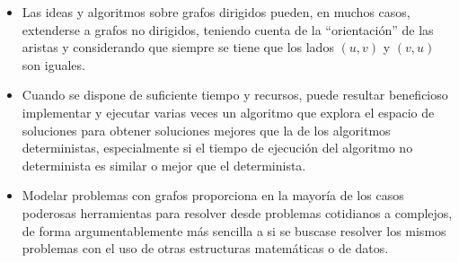 \documentclass[11pt]{article}
\begin{document}
\begin{itemize}
   \item Las ideas y algoritmos sobre grafos dirigidos pueden, en
   muchos casos, extenderse a grafos no dirigidos, teniendo cuenta
   de la ``orientación'' de las aristas y considerando que siempre se 
   tiene que los lados $(u, v)$ y $(v, u)$ son iguales.

   \item Cuando se dispone de suficiente tiempo y recursos, puede
   resultar beneficioso implementar y ejecutar varias veces un
   algoritmo que explora el espacio de soluciones para obtener
   soluciones mejores que la de los algoritmos deterministas, 
   especialmente si el tiempo de ejecución del algoritmo no
   determinista es similar o mejor que el determinista.

   \item Modelar problemas con grafos proporciona en la mayoría de
   los casos poderosas herramientas para resolver desde problemas
   cotidianos a complejos, de forma argumentablemente más sencilla
   a si se buscase resolver los mismos problemas con el uso de 
   otras estructuras matemáticas o de datos.

\end{itemize}
\end{document}
